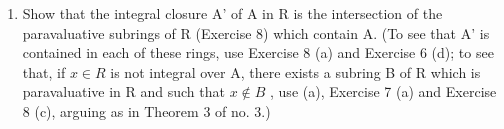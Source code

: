 \begin{enumerate}
\def\labelenumi{(\alph{enumi})}
\setcounter{enumi}{1}
\tightlist
\item
  Show that the integral closure A' of A in R is the intersection of the paravaluative subrings of R (Exercise 8) which contain A. (To see that A' is contained in each of these rings, use Exercise 8 (a) and Exercise 6 (d); to see that, if \(x \in R\) is not integral over A, there exists a subring B of R which is paravaluative in R and such that \(x \notin B\) , use (a), Exercise 7 (a) and Exercise 8 (c), arguing as in Theorem 3 of no. 3.)
\end{enumerate}

